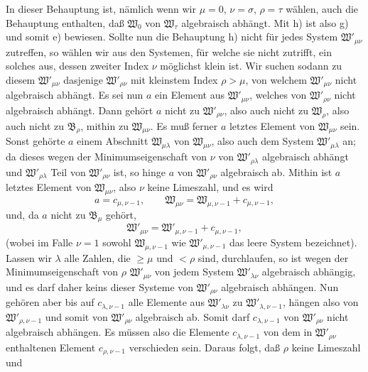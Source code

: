In dieser Behauptung ist, nämlich wenn wir \(\mu=0\), \(\nu=\sigma\), \(\rho=\tau\) wählen, auch die Behauptung enthalten, daß \(\mathfrak W_0\) von \(\mathfrak W_\tau\) algebraisch abhängt. Mit h) ist also g) und somit e) bewiesen. Sollte nun die Behauptung h) nicht für jedes System \(\mathfrak W'_{\mu\nu}\) zutreffen, so wählen wir aus den Systemen, für welche sie nicht zutrifft, ein solches aus, dessen zweiter Index \(\nu\) möglichst klein ist. Wir suchen sodann zu diesem \(\mathfrak W'_{\mu\nu}\) dasjenige \(\mathfrak W'_{\rho\nu}\) mit kleinstem Index \(\rho>\mu\), von welchem \(\mathfrak W'_{\mu\nu}\) nicht algebraisch abhängt. Es sei nun \(a\) ein Element aus \(\mathfrak W'_{\mu\nu}\), welches von \(\mathfrak W'_{\rho\nu}\) nicht algebraisch abhängt. Dann gehört \(a\) nicht zu \(\mathfrak W'_{\rho\nu}\), also auch nicht zu \(\mathfrak W_\rho\), also auch nicht zu \(\mathfrak B_\rho\), mithin zu \(\mathfrak W_{\mu\nu}\). Es muß ferner \(a\) letztes Element von \(\mathfrak W_{\mu\nu}\) sein. Sonst gehörte \(a\) einem Abschnitt \(\mathfrak W_{\mu\lambda}\) von \(\mathfrak W_{\mu\nu}\), also auch dem System \(\mathfrak W'_{\mu\lambda}\) an; da dieses wegen der Minimumseigenschaft von \(\nu\) von \(\mathfrak W'_{\rho\lambda}\) algebraisch abhängt und \(\mathfrak W'_{\rho\lambda}\) Teil von \(\mathfrak W'_{\rho\nu}\) ist, so hinge \(a\) von \(\mathfrak W'_{\rho\nu}\) algebraisch ab. Mithin ist \(a\) letztes Element von \(\mathfrak W_{\mu\nu}\), also \(\nu\) keine Limeszahl, und es wird
\[
a=c_{\mu,\nu-1},\qquad
\mathfrak W_{\mu\nu}=\mathfrak W_{\mu,\nu-1}+c_{\mu,\nu-1},
\]
und, da \(a\) nicht zu \(\mathfrak B_\mu\) gehört,
\[
\mathfrak W'_{\mu\nu}=\mathfrak W'_{\mu,\nu-1}+c_{\mu,\nu-1},
\]
(wobei im Falle \(\nu=1\) sowohl \(\mathfrak W_{\mu,\nu-1}\) wie \(\mathfrak W'_{\mu,\nu-1}\) das leere System bezeichnet). Lassen wir \(\lambda\) alle Zahlen, die \(\geq\mu\) und \(<\rho\) sind, durchlaufen, so ist wegen der Minimumseigenschaft von \(\rho\) \(\mathfrak W'_{\mu\nu}\) von jedem System \(\mathfrak W'_{\lambda\nu}\) algebraisch abhängig, und es darf daher keins dieser Systeme von \(\mathfrak W'_{\rho\nu}\) algebraisch abhängen. Nun gehören aber bis auf \(c_{\lambda,\nu-1}\) alle Elemente aus \(\mathfrak W'_{\lambda\nu}\) zu \(\mathfrak W'_{\lambda,\nu-1}\), hängen also von \(\mathfrak W'_{\rho,\nu-1}\) und somit von \(\mathfrak W'_{\rho\nu}\) algebraisch ab. Somit darf \(c_{\lambda,\nu-1}\) von \(\mathfrak W'_{\rho\nu}\) nicht algebraisch abhängen. Es müssen also die Elemente \(c_{\lambda,\nu-1}\) von dem in \(\mathfrak W'_{\rho\nu}\) enthaltenen Element \(c_{\rho,\nu-1}\) verschieden sein. Daraus folgt, daß \(\rho\) keine Limeszahl und
